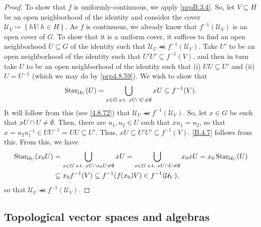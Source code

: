 \begin{prp}
\begin{savenotes}
\begin{proof}
To show that $f$ is uniformly-continuous, we apply \cref{prpB.3.4}.  So, let $V\subseteq H$ be an open neighborhood of the identity and consider the cover $\mathcal{U}_V\coloneqq \left\{ hV:h\in H\right\}$.  As $f$ is continuous, we already know that $f^{-1}(\mathcal{U}_V)$ is an open cover of $G$.  To show that it is a uniform cover, it suffices to find an open neighborhood $U\subseteq G$ of the identity such that $\mathcal{U}_U\llcurly f^{-1}(\mathcal{U}_V)$.  Take $U'$ to be an open neighborhood of the identity such that $U'U'\subseteq f^{-1}(V)$, and then in turn take $U$ to be an open neighborhood of the identity such that (i) $UU\subseteq U'$ and (ii) $U=U^{-1}$ (which we may do by \cref{prp4.8.59}).  We wish to show that
\begin{equation}\label{B.4.7}
\operatorname{Star} _{\mathcal{U}_U}(U)=\bigcup _{x\in G\text{ s.t.~} xU\cap U\neq \emptyset}xU\subseteq f^{-1}(V).
\end{equation}
It will follow from this (see \eqref{4.8.72}) that $\mathcal{U}_U\llcurly f^{-1}(\mathcal{U}_V)$.  So, let $x\in G$ be such that $xU\cap U\neq \emptyset$.  Then, there are $u_1,u_2\in U$ such that $xu_1=u_2$, so that $x=u_2u_1^{-1}\in UU^{-1}=UU\subseteq U'$.  Thus, $xU\subseteq U'U'\subseteq f^{-1}(V)$.  \eqref{B.4.7} follows from this.  From this, we have
\begin{equation}\label{4.8.72}
\begin{split}
\operatorname{Star} _{\mathcal{U}_U}(x_0U) & =\bigcup _{x\in G\text{ s.t.~} xU\cap x_0U\neq \emptyset}xU=\bigcup _{x\in G\text{ s.t.~} xU\cap U\neq \emptyset}x_0xU=x_0\operatorname{Star} _{\mathcal{U}_U}(U) \\
& \subseteq x_0f^{-1}(V)\subseteq f^{-1}(f(x_0)V)\in f^{-1}(\mathcal{U}_V),
\end{split}
\end{equation}
so that $\mathcal{U}_U\llcurly f^{-1}(\mathcal{U}_V)$.
\end{proof}
\end{savenotes}
\end{prp}

\subsection{Topological vector spaces and algebras}

